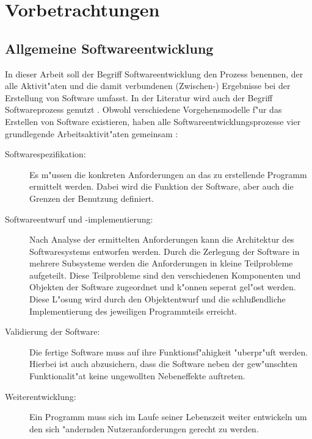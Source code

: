 \chapter{Vorbetrachtungen}

\section{Allgemeine Softwareentwicklung}
\label{sec:allgemeine_softwareentwicklung}

In dieser Arbeit soll der Begriff Softwareentwicklung den Prozess benennen, der alle Aktivit"aten und die damit verbundenen (Zwischen-) Ergebnisse bei der Erstellung von Software umfasst.
In der Literatur wird auch der Begriff Softwareprozess genutzt \cite{Sommerville2001a}.
Obwohl verschiedene Vorgehensmodelle f"ur das Erstellen von Software existieren, haben alle Softwareentwicklungsprozesse vier grundlegende Arbeitsaktivit"aten gemeinsam \cite{Brugge2004a,Sommerville2001a}:
\begin{description}
	\item[Softwarespezifikation:] Es m"ussen die konkreten Anforderungen an das zu erstellende Programm ermittelt werden.
								  Dabei wird die Funktion der Software, aber auch die Grenzen der Benutzung definiert.
	\item[Softwareentwurf und -implementierung:] Nach Analyse der ermittelten Anforderungen kann die Architektur des Softwaresystems entworfen werden.
												 Durch die Zerlegung der Software in mehrere Subsysteme werden die Anforderungen in kleine Teilprobleme aufgeteilt.
												 Diese Teilprobleme sind den verschiedenen Komponenten und Objekten der Software zugeordnet und k"onnen seperat gel"ost werden.
												 Diese L"osung wird durch den Objektentwurf und die schlu\ss endliche Implementierung des jeweiligen Programmteils erreicht.
	\item[Validierung der Software:] Die fertige Software muss auf ihre Funktionsf"ahigkeit "uberpr"uft werden.
									 Hierbei ist auch abzusichern, dass die Software neben der gew"unschten Funktionalit"at keine ungewollten Nebeneffekte auftreten.
	\item[Weiterentwicklung:] Ein Programm muss sich im Laufe seiner Lebenszeit weiter entwickeln um den sich "andernden Nutzeranforderungen gerecht zu werden.
\end{description}

